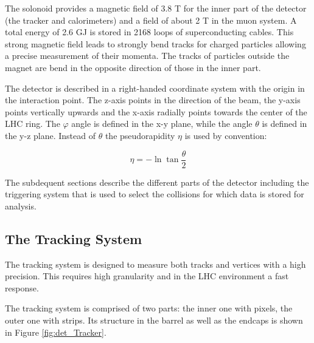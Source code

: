 The solonoid provides a magnetic field of 3.8 T for the inner part of the detector (the tracker and calorimeters) and a field of about 2 T in the muon system.
A total energy of 2.6 GJ  is stored in 2168 loops of superconducting cables.
This strong magnetic field leads to strongly bend tracks for charged particles allowing a precise measurement of their momenta. 
The tracks of particles outside the magnet are bend in the opposite direction of those in the inner part.

The detector is described in a right-handed coordinate system with the origin in the interaction point.
The z-axis points in the direction of the beam, the y-axis points vertically upwards and the x-axis radially points towards the center of the LHC ring.
The $\varphi$ angle is defined in the x-y plane, while the angle $\theta$ is defined in the y-z plane. Instead of $\theta$ the pseudorapidity $\eta$ is used by convention:

\begin{equation}
\eta = -\ln{\tan{\frac{\theta}{2}}}
\end{equation}

The subdequent sections describe the different parts of the detector including the triggering system that is used to select the collisions for which data is stored for analysis.


\subsection{The Tracking System}

The tracking system \cite{Bayatian:922757} is designed to measure both tracks and vertices with a high precision.
This requires high granularity and in the LHC environment a fast response.

The tracking system is comprised of two parts: the inner one with pixels, the outer one with strips.
Its structure in the barrel as well as the endcaps is shown in Figure \ref{fig:det_Tracker}.


